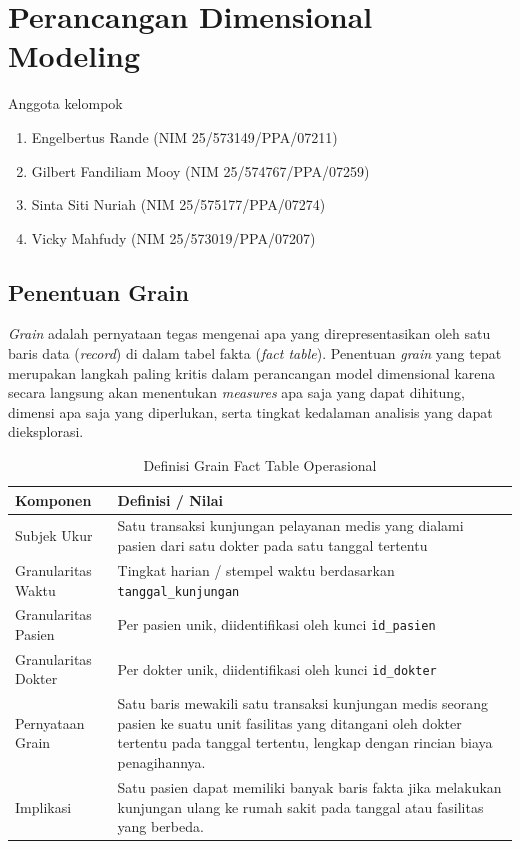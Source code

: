 
\chapter{Perancangan Dimensional Modeling}

\begin{mybox}{Anggota kelompok}
	\begin{enumerate}
		\itemsep0em
		\item Engelbertus Rande (NIM 25/573149/PPA/07211)
		\item Gilbert Fandiliam Mooy (NIM 25/574767/PPA/07259)
		\item Sinta Siti Nuriah (NIM 25/575177/PPA/07274)
		\item Vicky Mahfudy (NIM 25/573019/PPA/07207)
	\end{enumerate}
\end{mybox}

 
\section{Penentuan Grain}
 
\textit{Grain} adalah pernyataan tegas mengenai apa yang direpresentasikan oleh satu baris data (\textit{record}) di dalam tabel fakta (\textit{fact table}). Penentuan \textit{grain} yang tepat merupakan langkah paling kritis dalam perancangan model dimensional karena secara langsung akan menentukan \textit{measures} apa saja yang dapat dihitung, dimensi apa saja yang diperlukan, serta tingkat kedalaman analisis yang dapat dieksplorasi.
 
\begin{table}[H]
\centering
\caption{Definisi Grain Fact Table Operasional}
\begin{tabularx}{\linewidth}{lX}
\toprule
\textbf{Komponen} & \textbf{Definisi / Nilai} \\
\midrule
Subjek Ukur            & Satu transaksi kunjungan pelayanan medis yang dialami pasien dari satu dokter pada satu tanggal tertentu \\
Granularitas Waktu     & Tingkat harian / stempel waktu berdasarkan \texttt{tanggal\_kunjungan} \\
Granularitas Pasien    & Per pasien unik, diidentifikasi oleh kunci \texttt{id\_pasien} \\
Granularitas Dokter    & Per dokter unik, diidentifikasi oleh kunci \texttt{id\_dokter} \\
Pernyataan Grain       & Satu baris mewakili satu transaksi kunjungan medis seorang pasien ke suatu unit fasilitas yang ditangani oleh dokter tertentu pada tanggal tertentu, lengkap dengan rincian biaya penagihannya. \\
Implikasi              & Satu pasien dapat memiliki banyak baris fakta jika melakukan kunjungan ulang ke rumah sakit pada tanggal atau fasilitas yang berbeda. \\
\bottomrule
\end{tabularx}
\end{table}
 
